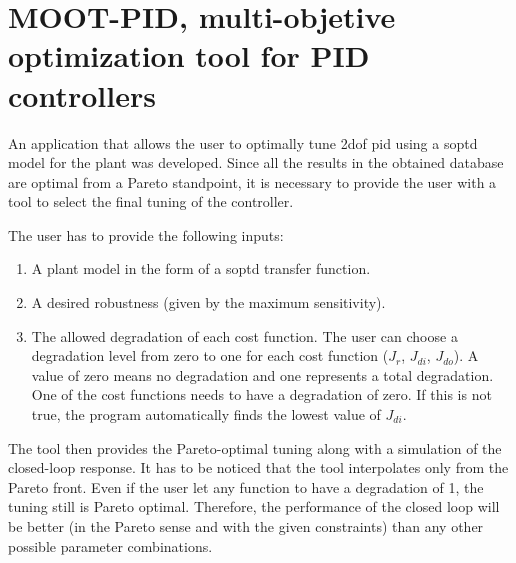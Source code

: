 \section{MOOT-PID, multi-objetive optimization tool for PID controllers}
\label{sec:results}
%
An application that allows the user to optimally tune \gls{2dof} \gls{pid} using a \gls{soptd} model for the plant was developed. Since all the results in the obtained database are optimal from a Pareto standpoint, it is necessary to provide the user with a tool to select the final tuning of the controller.

The user has to provide the following inputs:
\begin{enumerate}
	\item A plant model in the form of a \gls{soptd} transfer function.
	\item A desired robustness (given by the maximum sensitivity).
	\item The allowed degradation of each cost function. The user can choose a degradation level from zero to one for each cost function ($J_r$, $J_{di}$, $J_{do}$). A value of zero means no degradation and one represents a total degradation. One of the cost functions needs to have a degradation of zero. If this is not true, the program automatically finds the lowest value of $J_{di}$.
\end{enumerate}
%
The tool then provides the Pareto-optimal tuning along with a simulation of the closed-loop response. It has to be noticed that the tool interpolates only from the Pareto front. Even if the user let any function to have a degradation of 1, the tuning still is Pareto optimal. Therefore, the performance of the closed loop will be better (in the Pareto sense and with the given constraints) than any other possible parameter combinations.


